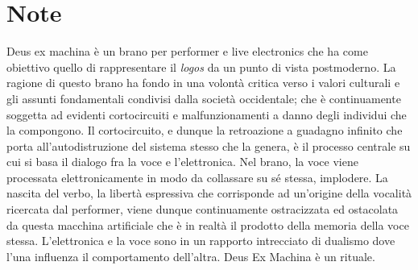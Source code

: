 \documentclass[12pt]{article}
\begin{document}


\section*{Note}
Deus ex machina è un brano per performer e live electronics che ha come obiettivo quello di rappresentare il 
\emph{logos} da un punto di vista postmoderno.
La ragione di questo brano ha fondo in una volontà critica verso i valori culturali 
e gli assunti fondamentali condivisi dalla società occidentale; 
che è continuamente soggetta ad evidenti cortocircuiti e malfunzionamenti a danno degli individui che la compongono.
\newline
Il cortocircuito, e dunque la retroazione a guadagno infinito che porta all'autodistruzione 
del sistema stesso che la genera,
è il processo centrale su cui si basa il dialogo fra la voce e l'elettronica.
Nel brano, la voce viene processata elettronicamente in modo da collassare su sé stessa, implodere.
\newline
La nascita del verbo, la libertà espressiva che corrisponde ad un'origine della vocalità ricercata dal performer, 
viene dunque continuamente ostracizzata ed ostacolata da questa macchina artificiale che è in realtà il prodotto della memoria della voce stessa.
L'elettronica e la voce sono in un rapporto intrecciato di dualismo dove l'una influenza il comportamento dell'altra.
\newline \newline
Deus Ex Machina è un rituale.
\end{document}
